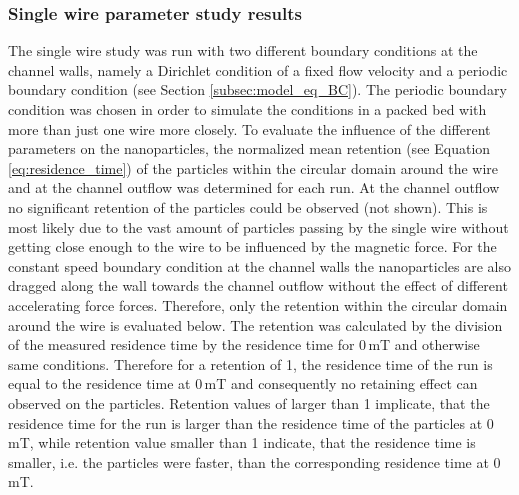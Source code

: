 \subsubsection{Single wire parameter study results}
\label{subsubsec:One_wire}

The single wire study was run with two different boundary conditions at the channel walls, namely a Dirichlet condition of a fixed flow velocity and a periodic boundary condition (see Section \ref{subsec:model_eq_BC}). The periodic boundary condition was chosen in order to simulate the conditions in a packed bed with more than just one wire more closely. To evaluate the influence of the different parameters on the nanoparticles, the normalized mean retention (see Equation\,\ref{eq:residence_time}) of the particles within the circular domain around the wire and at the channel outflow  was determined for each run. At the channel outflow no significant retention of the particles could be observed (not shown). This is most likely due to the vast amount of particles passing by the single wire without getting close enough to the wire to be influenced by the magnetic force. For the constant speed boundary condition at the channel walls the nanoparticles are also dragged along the wall towards the channel outflow without the effect of different accelerating force forces. Therefore, only the retention within the circular domain around the wire is evaluated below. The retention was calculated by the division of the measured residence time by the residence time for 0\,mT and otherwise same conditions. Therefore for a retention of 1, the residence time of the run is equal to the residence time at 0\,mT and consequently no retaining effect can observed on the particles. Retention values of larger than 1 implicate, that the residence time for the run is larger than the residence time of the particles at 0\,mT, while retention value smaller than 1 indicate, that the residence time is smaller, i.e. the particles were faster, than the corresponding residence time at 0\,mT.  

